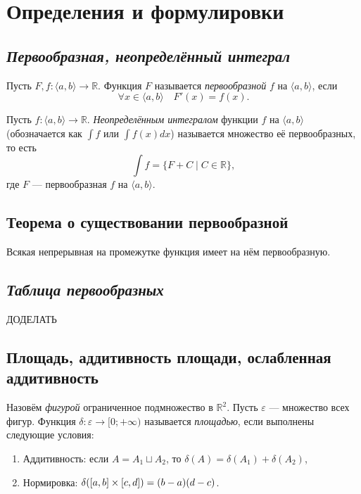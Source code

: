 \section{Определения и формулировки}

\subsection{\itshape Первообразная, неопределённый интеграл}
 
\begin{definition}
	Пусть $F, f \colon \langle a, b \rangle \to \mathbb{R}$.
	Функция $F$ называется \textit{первообразной} $f$ на $\langle a, b \rangle$, если
	\[
		\forall x \in \langle a, b \rangle \quad F'(x) = f(x).
	\]
\end{definition}

\begin{definition}
	Пусть $f \colon \langle a, b \rangle \to \mathbb{R}$.
	\textit{Неопределённым интегралом} функции $f$ на $\langle a, b \rangle$
	(обозначается как $\int f$ или $\int f(x) dx$) называется множество её первообразных,
	то есть 
	\[
		\int f = \{ F + C \mid C \in \mathbb{R} \},
	\]
	где $F$ --- первообразная $f$ на $\langle a, b \rangle$.
\end{definition}

\subsection{Теорема о существовании первообразной}

\begin{theorem}
	Всякая непрерывная на промежутке функция имеет на нём первообразную.
\end{theorem}

\subsection{\itshape Таблица первообразных}

ДОДЕЛАТЬ

\subsection{Площадь, аддитивность площади, ослабленная аддитивность}

\begin{definition}
	Назовём \textit{фигурой} ограниченное подмножество в $\mathbb{R}^2$.
	Пусть $\varepsilon$ --- множество всех фигур. Функция $\delta \colon \varepsilon \to [0; +\infty)$ называется \textit{площадью},
	если выполнены следующие условия:
	\begin{enumerate}
		\item Аддитивность: если $A = A_1 \sqcup A_2$, то $\delta (A) = \delta (A_1) + \delta (A_2)$,
		\item Нормировка: $\hbox{$\delta ([a, b] \times [c, d])$} = (b - a) (d - c)$.
	\end{enumerate}
\end{definition}


